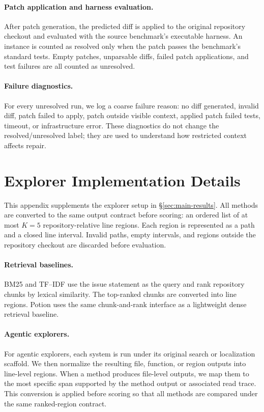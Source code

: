 \documentclass{llmxive}
\begin{document}
\paragraph{Patch application and harness evaluation.}
After patch generation, the predicted diff is applied to the original repository
checkout and evaluated with the source benchmark's executable harness. An
instance is counted as resolved only when the patch passes the benchmark's
standard tests. Empty patches, unparsable diffs, failed patch applications, and
test failures are all counted as unresolved.

\paragraph{Failure diagnostics.}
For every unresolved run, we log a coarse failure reason: no diff generated,
invalid diff, patch failed to apply, patch outside visible context, applied patch
failed tests, timeout, or infrastructure error. These diagnostics do not change
the resolved/unresolved label; they are used to understand how restricted
context affects repair.


\section{Explorer Implementation Details}
\label{app:explorers}

This appendix supplements the explorer setup in \S\ref{sec:main-results}. All
methods are converted to the same output contract before scoring: an ordered
list of at most $K=5$ repository-relative line regions. Each region is represented
as a path and a closed line interval. Invalid paths, empty intervals, and regions
outside the repository checkout are discarded before evaluation.

\paragraph{Retrieval baselines.}
BM25 and TF--IDF use the issue statement as the query and rank repository chunks
by lexical similarity. The top-ranked chunks are converted into line regions.
Potion uses the same chunk-and-rank interface as a lightweight dense retrieval
baseline.

\paragraph{Agentic explorers.}
For agentic explorers, each system is run under its original search or
localization scaffold. We then normalize the resulting file, function, or region
outputs into line-level regions. When a method produces file-level outputs, we
map them to the most specific span supported by the method output or associated
read trace. This conversion is applied before scoring so that all methods are
compared under the same ranked-region contract.
\end{document}
